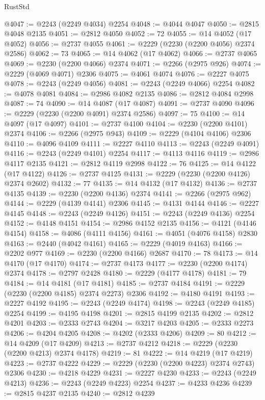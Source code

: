 \begin{lexlean}{RustStd}
\begin{coremodule}
{\begin{coremodule}
{{{{{{{{{{{{{{{{{{{{{{{{{{{{{{{{{{@4047 := @2243 (@2249 @4034) @2254
@4048 := @4044 @4047
@4050 := @2815 @4048 @2135
@4051 := @2812 @4050
@4052 := 72
@4055 := @14 @4052 (@17 @4052)
@4056 := @2737 @4055
@4061 := @2229 (@2230 (@2200 @4056) @2374 @2586)
@4062 := 73
@4065 := @14 @4062 (@17 @4062)
@4066 := @2737 @4065
@4069 := @2230 (@2200 @4066) @2374
@4071 := @2266 (@2975 @926)
@4074 := @2229 (@4069 @4071) @2306
@4075 := @4061 @4074
@4076 := @2227 @4075
@4078 := @2243 (@2249 @4056)
@4081 := @2243 (@2249 @4066) @2254
@4082 := @4078 @4081
@4084 := @2986 @4082 @2135
@4086 := @2812 @4084 @2998
@4087 := 74
@4090 := @14 @4087 (@17 @4087)
@4091 := @2737 @4090
@4096 := @2229 (@2230 (@2200 @4091) @2374 @2586)
@4097 := 75
@4100 := @14 @4097 (@17 @4097)
@4101 := @2737 @4100
@4104 := @2230 (@2200 @4101) @2374
@4106 := @2266 (@2975 @943)
@4109 := @2229 (@4104 @4106) @2306
@4110 := @4096 @4109
@4111 := @2227 @4110
@4113 := @2243 (@2249 @4091)
@4116 := @2243 (@2249 @4101) @2254
@4117 := @4113 @4116
@4119 := @2986 @4117 @2135
@4121 := @2812 @4119 @2998
@4122 := 76
@4125 := @14 @4122 (@17 @4122)
@4126 := @2737 @4125
@4131 := @2229 (@2230 (@2200 @4126) @2374 @2602)
@4132 := 77
@4135 := @14 @4132 (@17 @4132)
@4136 := @2737 @4135
@4139 := @2230 (@2200 @4136) @2374
@4141 := @2266 (@2975 @962)
@4144 := @2229 (@4139 @4141) @2306
@4145 := @4131 @4144
@4146 := @2227 @4145
@4148 := @2243 (@2249 @4126)
@4151 := @2243 (@2249 @4136) @2254
@4152 := @4148 @4151
@4154 := @2986 @4152 @2135
@4156 := @4121 (@4146 @4154)
@4158 := @4086 (@4111 @4156)
@4161 := @4051 (@4076 @4158) @2830
@4163 := @2440 (@4042 @4161)
@4165 := @2229 (@4019 @4163)
@4166 := @2202 @977
@4169 := @2230 (@2200 @4166) @2687
@4170 := 78
@4173 := @14 @4170 (@17 @4170)
@4174 := @2737 @4173
@4177 := @2230 (@2200 @4174) @2374
@4178 := @2797 @2428
@4180 := @2229 (@4177 @4178)
@4181 := 79
@4184 := @14 @4181 (@17 @4181)
@4185 := @2737 @4184
@4191 := @2229 (@2230 (@2200 @4185) @2374 @2273) @2306
@4192 := @4180 @4191
@4193 := @2227 @4192
@4195 := @2243 (@2249 @4174)
@4198 := @2243 (@2249 @4185) @2254
@4199 := @4195 @4198
@4201 := @2815 @4199 @2135
@4202 := @2812 @4201
@4203 := @2333 @2743
@4204 := @3217 @4203
@4205 := @2333 @2273
@4206 := @4204 @4205
@4208 := @4202 (@2333 @4206)
@4209 := 80
@4212 := @14 @4209 (@17 @4209)
@4213 := @2737 @4212
@4218 := @2229 (@2230 (@2200 @4213) @2374 @4178)
@4219 := 81
@4222 := @14 @4219 (@17 @4219)
@4223 := @2737 @4222
@4229 := @2229 (@2230 (@2200 @4223) @2374 @2743) @2306
@4230 := @4218 @4229
@4231 := @2227 @4230
@4233 := @2243 (@2249 @4213)
@4236 := @2243 (@2249 @4223) @2254
@4237 := @4233 @4236
@4239 := @2815 @4237 @2135
@4240 := @2812 @4239
}}}}}}}}}}}}}}}}}}}}}}}}}}}}}}}}}}
\end{coremodule}}
\end{coremodule}
\end{lexlean}
